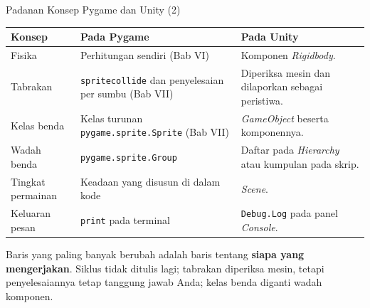 \documentclass[aspectratio=169,10pt]{beamer}
\begin{document}
\begin{frame}{Padanan Konsep Pygame dan Unity (2)}
{\scriptsize
\renewcommand{\arraystretch}{1.06}
\begin{tabularx}{\textwidth}{@{}>{\raggedright\arraybackslash}p{3.0cm}
    >{\raggedright\arraybackslash}p{4.4cm}
    >{\raggedright\arraybackslash}X@{}}
\toprule
\textbf{Konsep} & \textbf{Pada Pygame} & \textbf{Pada Unity} \\
\midrule
Fisika & Perhitungan sendiri (Bab VI) &
  Komponen \emph{Rigidbody}. \\
\addlinespace
Tabrakan & \texttt{spritecollide} dan penyelesaian per sumbu (Bab VII) &
  Diperiksa mesin dan dilaporkan sebagai peristiwa. \\
\addlinespace
Kelas benda & Kelas turunan \texttt{pygame.sprite.Sprite} (Bab VII) &
  \emph{GameObject} beserta komponennya. \\
\addlinespace
Wadah benda & \texttt{pygame.sprite.Group} &
  Daftar pada \emph{Hierarchy} atau kumpulan pada skrip. \\
\addlinespace
Tingkat permainan & Keadaan yang disusun di dalam kode &
  \emph{Scene}. \\
\addlinespace
Keluaran pesan & \texttt{print} pada terminal &
  \texttt{Debug.Log} pada panel \emph{Console}. \\
\bottomrule
\end{tabularx}}
\vspace{0.10cm}
{\footnotesize\color{ubMuted}Baris yang paling banyak berubah adalah baris
tentang \textbf{siapa yang mengerjakan}. Siklus tidak ditulis lagi; tabrakan
diperiksa mesin, tetapi penyelesaiannya tetap tanggung jawab Anda; kelas benda
diganti wadah komponen.}
\end{frame}
\end{document}
